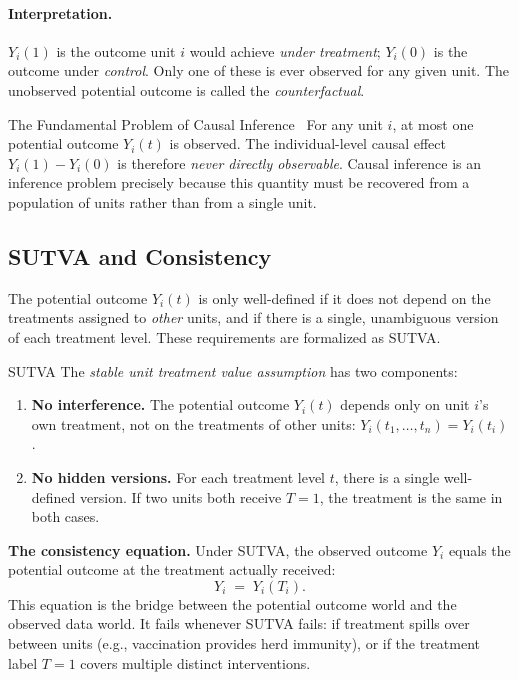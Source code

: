 \documentclass[master.tex]{subfiles}
\begin{document}
\paragraph{Interpretation.}
$Y_i(1)$ is the outcome unit $i$ would achieve \emph{under treatment};
$Y_i(0)$ is the outcome under \emph{control}.  Only one of these is ever
observed for any given unit.  The unobserved potential outcome is called the
\emph{counterfactual}.

\begin{warn}{The Fundamental Problem of Causal Inference}
\citep{holland1986statistics}\ For any unit $i$, at most one potential
outcome $Y_i(t)$ is observed.
The individual-level causal effect $Y_i(1) - Y_i(0)$ is therefore
\emph{never directly observable}.  Causal inference is an inference problem
precisely because this quantity must be recovered from a population of units
rather than from a single unit.
\end{warn}

\subsection{SUTVA and Consistency}

The potential outcome $Y_i(t)$ is only well-defined if it does not depend
on the treatments assigned to \emph{other} units, and if there is a single,
unambiguous version of each treatment level.  These requirements are
formalized as SUTVA.

\begin{defn}{SUTVA \citep{rubin1980randomization}}
\label{w4:defn:sutva}
The \emph{stable unit treatment value assumption} has two components:
\begin{enumerate}
  \item \textbf{No interference.}  The potential outcome $Y_i(t)$ depends
        only on unit $i$'s own treatment, not on the treatments of other
        units: $Y_i(t_1, \ldots, t_n) = Y_i(t_i)$.
  \item \textbf{No hidden versions.}  For each treatment level $t$, there
        is a single well-defined version.  If two units both receive $T=1$,
        the treatment is the same in both cases.
\end{enumerate}
\end{defn}

\noindent\textbf{The consistency equation.}
Under SUTVA, the observed outcome $Y_i$ equals the potential outcome at the
treatment actually received:
\begin{equation}
  Y_i \;=\; Y_i(T_i).
  \label{w4:eq:consistency}
\end{equation}
This equation is the bridge between the potential outcome world and the
observed data world.  It fails whenever SUTVA fails: if treatment spills
over between units (e.g., vaccination provides herd immunity), or if the
treatment label $T=1$ covers multiple distinct interventions.
\end{document}
